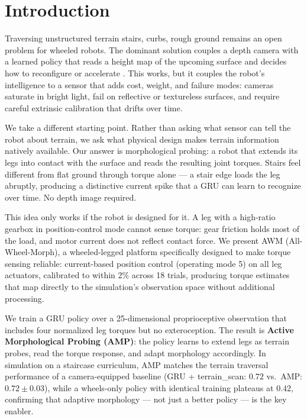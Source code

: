 \documentclass{article}
\begin{document}

\section{Introduction}

Traversing unstructured terrain stairs, curbs, rough ground remains an open problem
for wheeled robots. The dominant solution couples a depth camera with a learned policy that
reads a height map of the upcoming surface and decides how to reconfigure or accelerate
\citep{lee2020learning, miki2022learning}. This works, but it couples the robot's
intelligence to a sensor that adds cost, weight, and failure modes: cameras saturate in
bright light, fail on reflective or textureless surfaces, and require careful extrinsic
calibration that drifts over time.

We take a different starting point. Rather than asking what sensor can tell the robot
about terrain, we ask what physical design makes terrain information natively
available. Our answer is morphological probing: a robot that extends its legs into
contact with the surface and reads the resulting joint torques. Stairs feel different from
flat ground through torque alone --- a stair edge loads the leg abruptly, producing a
distinctive current spike that a GRU can learn to recognize over time. No depth image
required.

This idea only works if the robot is designed for it. A leg with a high-ratio gearbox in
position-control mode cannot sense torque: gear friction holds most of the load, and motor
current does not reflect contact force. We present AWM (All-Wheel-Morph), a wheeled-legged
platform specifically designed to make torque sensing reliable: current-based position
control (operating mode 5) on all leg actuators, calibrated to within 2\% across 18 trials,
producing torque estimates that map directly to the simulation's observation space without
additional processing.

We train a GRU policy over a 25-dimensional proprioceptive observation that includes
four normalized leg torques but no exteroception. The result is \textbf{Active Morphological
Probing (AMP)}: the policy learns to extend legs as terrain probes, read the torque
response, and adapt morphology accordingly. In simulation on a staircase curriculum,
AMP matches the terrain traversal performance of a camera-equipped baseline (GRU +
terrain\_scan: $0.72$ vs.\ AMP: $0.72 \pm 0.03$), while a wheels-only policy with
identical training plateaus at $0.42$, confirming that adaptive morphology --- not just
a better policy --- is the key enabler.
\end{document}
